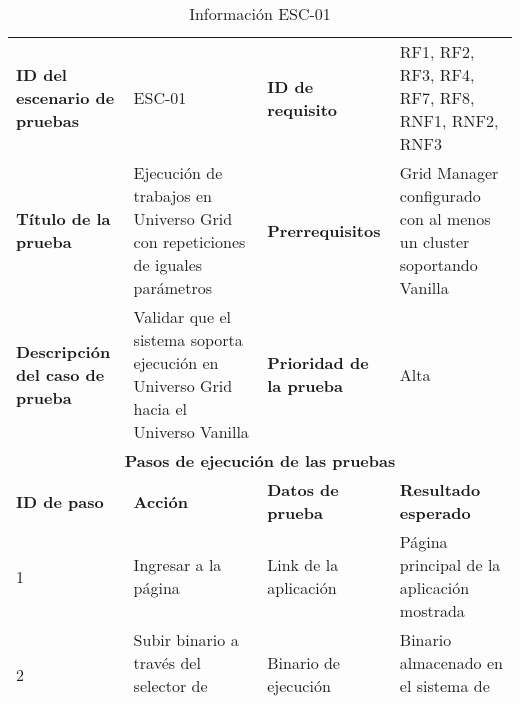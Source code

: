 \begin{table}[H]
	\centering
	\renewcommand{\arraystretch}{1.2} %
	\fontsize{9pt}{10pt}\selectfont %
	\begin{tabular}{|p{2cm}|p{4cm}|p{2.5cm}|p{4.7cm}|} %
		\hline
		\textbf{ID del escenario de pruebas} & ESC-01 & \textbf{ID de requisito} & RF1, RF2, RF3, RF4, RF7, RF8, RNF1, RNF2, RNF3 \\
        \textbf{Título de la prueba} & Ejecución de trabajos en Universo Grid con repeticiones de iguales parámetros & \textbf{Prerrequisitos} & Grid Manager configurado con al menos un cluster soportando Vanilla \\
        \textbf{Descripción del caso de prueba} & Validar que el sistema soporta ejecución en Universo Grid hacia el Universo Vanilla & \textbf{Prioridad de la prueba} & Alta \\
        \hline
        \multicolumn{4}{|c|}{\textbf{Pasos de ejecución de las pruebas}} \\
        \hline
        \textbf{ID de paso} & \textbf{Acción} & \textbf{Datos de prueba} & \textbf{Resultado esperado} \\
		1 & Ingresar a la página & Link de la aplicación & Página principal de la aplicación mostrada \\
        2 & Subir binario a través del selector de archivos & Binario de ejecución & Binario almacenado en el sistema de envío \\
        3 & Escribir argumentos adicionales (Opcional) & Argumentos adicionales & Argumentos seteados en el submit file dinámico \\
        4 & Seleccionar la naturaleza del trabajo (Distribuido) & Naturalezas permitidas & Universo seteado en el submit file dinámico \\
        5 & Seleccionar la información de distribución (Repeticiones con mismos parámetros) & Distribuciones permitidas & Agregada estructura necesaria al Submit file \\
        6 & Seleccionar cantidad de repeticiones & Repeticiones necesarias & Ciclo de envío en el archivo de shell creado \\
        7 & Seleccionar cluster más favorable & Métricas de clústeres & Recurso remoto del grid en el submit file establecido \\
        8 & Enviar trabajo & Submit file generado & Shell de envío y submit file ejecutado \\
        9 & Ver resultados a medida que van terminando & Resultados de trabajos & Salida de cada ejecución mostrada de forma organizada \\
        \hline
	\end{tabular}
	\caption{Información ESC-01}
	\label{table:esc-01}
\end{table}

